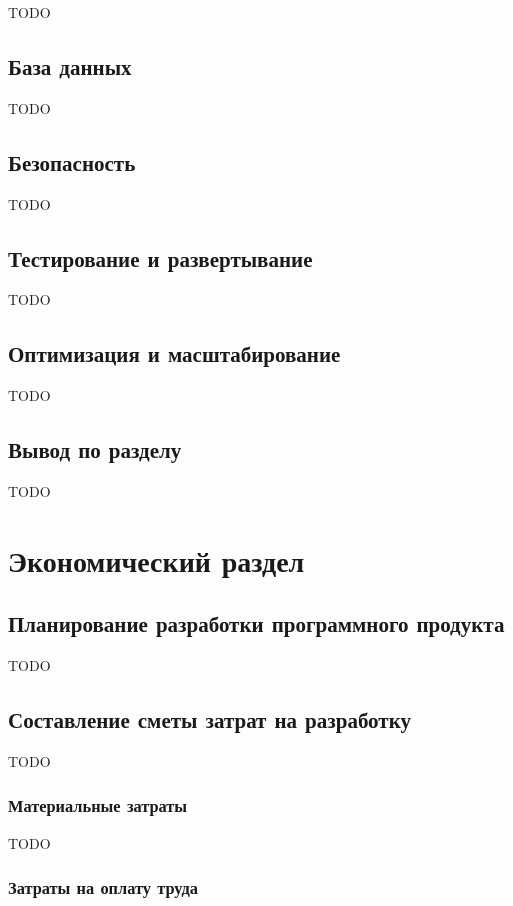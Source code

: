 \documentclass{mirea-prog-lang}
\begin{document}
TODO

\subsection{База данных}

TODO

\subsection{Безопасность}

TODO

\subsection{Тестирование и развертывание}

TODO

\subsection{Оптимизация и масштабирование}

TODO

\subsection*{Вывод по разделу}

TODO

\section{Экономический раздел}

\subsection{Планирование разработки программного продукта}

TODO

\subsection{Составление сметы затрат на разработку}

TODO

\subsubsection{Материальные затраты}

TODO

\subsubsection{Затраты на оплату труда}
\end{document}
